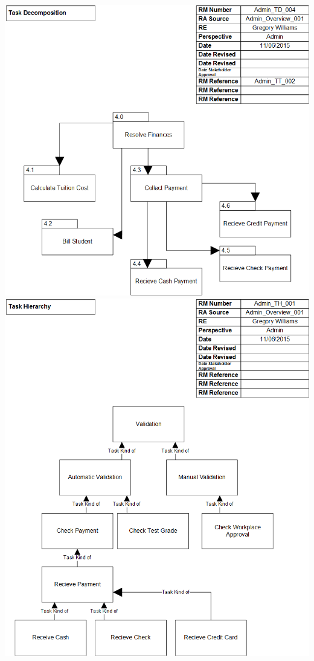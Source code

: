 \documentclass{article}
\begin{document}
	\includegraphics[width=\textwidth]{TaskDecomposition4}
	\\
	\includegraphics[width=\textwidth]{TaskHierarchy}
	\\
\end{document}
